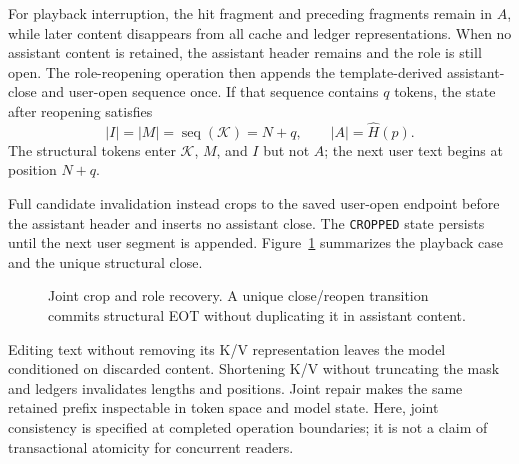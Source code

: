 For playback interruption, the hit fragment and preceding fragments remain in $A$, while later content disappears from all cache and ledger representations. When no assistant content is retained, the assistant header remains and the role is still open. The role-reopening operation then appends the template-derived assistant-close and user-open sequence once. If that sequence contains $q$ tokens, the state after reopening satisfies
\begin{equation}
|I|=|M|=\operatorname{seq}(\mathcal{K})=N+q,
\qquad |A|=\widehat H(p).
\label{eq:post-reopen}
\end{equation}
The structural tokens enter $\mathcal{K}$, $M$, and $I$ but not $A$; the next user text begins at position $N+q$.

Full candidate invalidation instead crops to the saved user-open endpoint before the assistant header and inserts no assistant close. The \texttt{CROPPED} state persists until the next user segment is appended. Figure~\ref{fig:state-repair} summarizes the playback case and the unique structural close.

\begin{figure}[t]
\centering
{}
\caption{Joint crop and role recovery. A unique close/reopen transition commits structural EOT without duplicating it in assistant content.}
\label{fig:state-repair}
\end{figure}

Editing text without removing its K/V representation leaves the model conditioned on discarded content. Shortening K/V without truncating the mask and ledgers invalidates lengths and positions. Joint repair makes the same retained prefix inspectable in token space and model state. Here, joint consistency is specified at completed operation boundaries; it is not a claim of transactional atomicity for concurrent readers.

